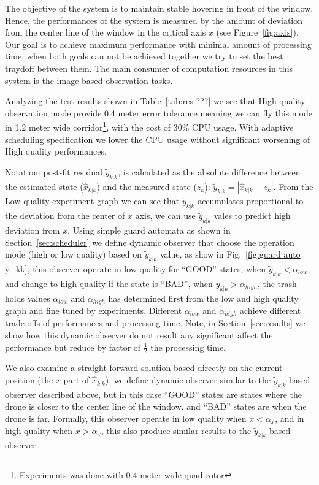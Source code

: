 \documentclass{sig-alternate-ipsn13}
\begin{document}
The objective of the system is to maintain stable hovering in front of the window. Hence, the performances of the system is measured by the amount of deviation from the center line of the window in the critical axis $x$ (see Figure~\ref{fig:axis}). Our goal is to achieve maximum performance with minimal amount of processing time, when both goals can not be achieved together we try to set the best traydoff between them. The main consumer of computation resources in this system is the image based observation tasks.

Analyzing the test results shown in Table~\ref{tab:res ???} we see that High quality observation mode provide 0.4 meter error tolerance meaning we can fly this mode in 1.2 meter wide corridor\footnote{Experiments was done with 0.4 meter wide quad-rotor}, with the cost of 30\% CPU usage. 
With adaptive scheduling specification we lower the CPU usage without significant worsening of High quality performances.

Notation: post-fit residual $\tilde{y}_{k|k}$, is calculated as the absolute difference between the estimated state ($\hat{x}_{k|k}$) and the measured state ($z_k$): $\tilde{y}_{k|k} = |  \hat{x}_{k|k} - z_k |$.
From the Low quality experiment graph we can see that $\tilde{y}_{k|k}$ accumulates proportional to the deviation from the center of $x$ axis, we can use $\tilde{y}_{k|k}$ vales to predict high deviation from $x$.
Using simple guard automata as shown in Section~\ref{sec:scheduler} we define dynamic observer that choose the operation mode (high or low quality) based on $\tilde{y}_{k|k}$ value, as show in Fig.~\ref{fig:guard auto y_kk}, this observer operate in low quality for ``GOOD'' states, when $\tilde{y}_{k|k} < \alpha_{low}$, and change to high quality if the state is ``BAD'', when $\tilde{y}_{k|k} > \alpha_{high}$, the trash holds values $ \alpha_{low}$ and $ \alpha_{high}$ has determined first from the low and high quality graph and fine tuned by experiments. 
Different $ \alpha_{low}$ and $ \alpha_{high}$ achieve different trade-offs of performances and processing time.
Note, in Section~\ref{sec:results} we show how this dynamic observer do not result any significant affect the performance but reduce by factor of $\frac{1}{2}$ the processing time.

We also examine a straight-forward solution based directly on the current position (the $x$ part of $\hat{x}_{k|k}$), we define dynamic observer similar to the $\tilde{y}_{k|k}$ based observer described above, but in this case ``GOOD'' states are states where the drone is closer to the center line of the window, and ``BAD'' states are when the drone is far.
Formally, this observer operate in low quality when $x < \alpha_x$, and in high quality when $x > \alpha_x$, this also produce similar results to the $\tilde{y}_{k|k}$ based observer.
\end{document}
